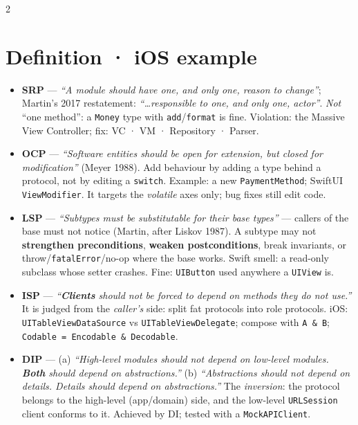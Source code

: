 \documentclass[8pt]{extarticle}
\begin{document}
\begin{multicols}{2}
\raggedright

\section{Definition · iOS example}
\begin{itemize}
  \item \textbf{SRP} — \emph{``A module should have one, and only one, reason to
        change''}; Martin's 2017 restatement: \emph{``\ldots responsible to one, and only
        one, actor''}. \emph{Not} ``one method'': a
        \texttt{Money} type with \texttt{add}/\texttt{format} is fine. Violation: the
        Massive View Controller; fix: VC · VM · Repository · Parser.
  \item \textbf{OCP} — \emph{``Software entities should be open for extension, but
        closed for modification''} (Meyer 1988). Add behaviour by adding a type behind
        a protocol, not by editing a \texttt{switch}. Example: a new
        \texttt{PaymentMethod}; SwiftUI \texttt{ViewModifier}. It targets the
        \emph{volatile} axes only; bug fixes still edit code.
  \item \textbf{LSP} — \emph{``Subtypes must be substitutable for their base
        types''} — callers of the base must not notice (Martin, after Liskov 1987). A
        subtype may not \textbf{strengthen preconditions}, \textbf{weaken
        postconditions}, break invariants, or throw/\texttt{fatalError}/no-op where the
        base works. Swift smell: a read-only subclass whose setter crashes. Fine:
        \texttt{UIButton} used anywhere a \texttt{UIView} is.
  \item \textbf{ISP} — \emph{``\textbf{Clients} should not be forced to depend on
        methods they do not use.''} It is judged from the \emph{caller's} side: split fat
        protocols into role protocols. iOS: \texttt{UITableViewDataSource} vs
        \texttt{UITableViewDelegate}; compose with \texttt{A \& B};
        \texttt{Codable = Encodable \& Decodable}.
  \item \textbf{DIP} — (a) \emph{``High-level modules should not depend on low-level
        modules. \textbf{Both} should depend on abstractions.''} (b) \emph{``Abstractions
        should not depend on details. Details should depend on abstractions.''} The
        \emph{inversion}: the protocol belongs to the high-level (app/domain) side, and
        the low-level \texttt{URLSession} client conforms to it. Achieved by DI; tested
        with a \texttt{MockAPIClient}.
\end{itemize}


\end{multicols}
\end{document}
